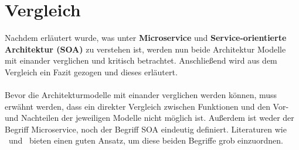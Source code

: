 \chapter{Vergleich}
\label{chap:vergleich}
Nachdem erläutert wurde, was unter \textbf{Microservice} und \textbf{Service-orientierte Architektur (SOA)} zu verstehen ist, werden nun beide Architektur Modelle mit einander verglichen und kritisch betrachtet. Anschließend wird aus dem Vergleich ein Fazit gezogen und dieses erläutert.
\\\\
Bevor die Architekturmodelle mit einander verglichen werden können, muss erwähnt werden, dass ein direkter Vergleich zwischen Funktionen und den Vor- und Nachteilen der jeweiligen Modelle nicht möglich ist. Außerdem ist weder der Begriff Microservice, noch der Begriff SOA eindeutig definiert. Literaturen wie \cite{100QA}\ und \cite{EWolff2016:Microservices}\ bieten einen guten Ansatz, um diese beiden Begriffe grob einzuordnen.

